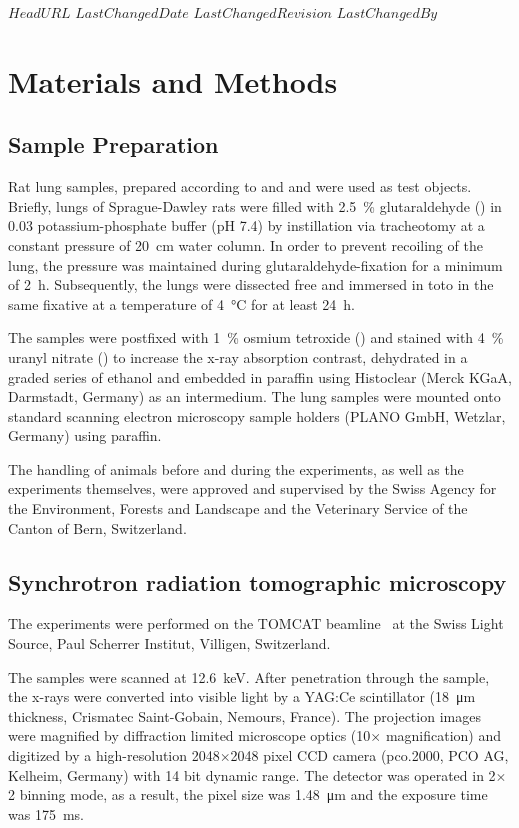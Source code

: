 \svnidlong
{$HeadURL$}
{$LastChangedDate$}
{$LastChangedRevision$}
{$LastChangedBy$}
%
\section{Materials and Methods}
\label{sec:materials and methods}
\subsection{Sample Preparation}
Rat lung samples, prepared according to
\ifhtml
	\citet{Tschanz2002} and \citet{Luyet2002}
\else
	 and 
\fi
were used as test objects. Briefly, lungs of Sprague-Dawley rats were filled with \SI{2.5}{\percent} glutaraldehyde () in \SI{0.03}{\Molar} potassium-phosphate buffer (pH 7.4) by instillation via tracheotomy at a constant pressure of \SI{20}{\centi\meter} water column. In order to prevent recoiling of the lung, the pressure was maintained during glutaraldehyde-fixation for a minimum of \SI{2}{\hour}. Subsequently, the lungs were dissected free and immersed in toto in the same fixative at a temperature of \SI{4}{\celsius} for at least \SI{24}{\hour}.

The samples were postfixed with \SI{1}{\percent} osmium tetroxide () and stained with \SI{4}{\percent} uranyl nitrate () to increase the x-ray absorption contrast, dehydrated in a graded series of ethanol and embedded in paraffin using Histoclear (Merck KGaA, Darmstadt, Germany) as an intermedium. The lung samples were mounted onto standard scanning electron microscopy sample holders (PLANO GmbH, Wetzlar, Germany) using paraffin.

The handling of animals before and during the experiments, as well as the experiments themselves, were approved and supervised by the Swiss Agency for the Environment, Forests and Landscape and the Veterinary Service of the Canton of Bern, Switzerland.

\subsection{Synchrotron radiation tomographic microscopy}
The experiments were performed on the TOMCAT beamline~\cite{Stampanoni2006a} at the Swiss Light Source, Paul Scherrer Institut, Villigen, Switzerland. \cbdelete

The samples were scanned at \SI{12.6}{\kilo\electronvolt}\cbdelete. After penetration through the sample, the x-rays were converted into visible light by a YAG:Ce scintillator (\SI{18}{\micro\meter} thickness, Crismatec Saint-Gobain, Nemours, France). The projection images were magnified by diffraction limited microscope optics (10$\times$ magnification) and digitized by a high-resolution 2048$\times$2048 pixel CCD camera (pco.2000, PCO AG, Kelheim, Germany) with 14 bit dynamic range. \cbstart The detector was operated in 2$\times$2 binning mode, as a result, the pixel size was \SI{1.48}{\micro\meter} and the exposure time was \SI{175}{\milli\second}.\cbend

